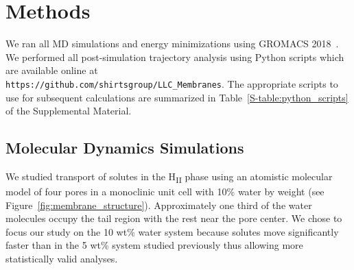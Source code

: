 \documentclass[aps,pre,preprint,groupedaddress,longbibliography]{revtex4-2}
\begin{document}
  \section{Methods}
    
  We ran all MD simulations and energy minimizations using GROMACS 2018~\cite{bekker_gromacs:_1993,berendsen_gromacs:_1995,van_der_spoel_gromacs:_2005,hess_gromacs_2008}.  %
  We performed all post-simulation trajectory analysis using Python scripts which 
  are available online at \\ \texttt{https://github.com/shirtsgroup/LLC\_Membranes}.
  The appropriate scripts to use for subsequent calculations are summarized in 
  Table~\ref{S-table:python_scripts} of the Supplemental Material.
  
  \subsection{Molecular Dynamics Simulations}

  We studied transport of solutes in the H\textsubscript{II} phase using an atomistic
  molecular model of four pores in a monoclinic unit cell with 10\% water by weight 
  (see Figure~\ref{fig:membrane_structure}). Approximately one third of the water 
  molecules occupy the tail region with the rest near the pore center. We chose to
  focus our study on the 10 wt\% water system because solutes move significantly 
  faster than in the 5 wt\% system studied previously thus allowing more statistically
  valid analyses.
  
\end{document}
